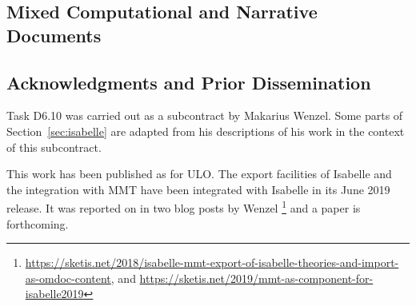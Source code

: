 \subsection{Mixed Computational and Narrative Documents}\label{subsec:software}

\subsection{Acknowledgments and Prior Dissemination}
Task D6.10  was carried out as a subcontract by Makarius Wenzel.
Some parts of Section~\ref{sec:isabelle} are adapted from his descriptions of his work in the context of this subcontract.

This work has been published as  for ULO.
The export facilities of Isabelle and the integration with MMT have been integrated with Isabelle in its June 2019 release.
It was reported on in two blog posts by Wenzel%
\footnote{\url{https://sketis.net/2018/isabelle-mmt-export-of-isabelle-theories-and-import-as-omdoc-content}, and \url{https://sketis.net/2019/mmt-as-component-for-isabelle2019}}
and a paper is forthcoming.

